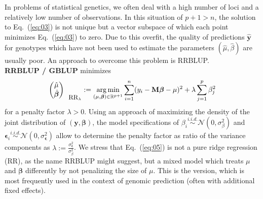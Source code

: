 \documentclass{bmcart}
\newcommand{\bb}{\bm{\beta}}
\DeclareMathOperator*{\argmin}{arg\,min}
\newcommand{\M}{\mathbf{M}}
\newcommand{\0}{\mathbf{0}}
\begin{document}
In problems of statistical genetics, we often deal with a high number of loci and a relatively low number of observations.
In this situation of $p + 1 > n$, the solution to Eq.~(\ref{eq:03}) is not unique but a vector subspace of which each point minimizes Eq.~(\ref{eq:03}) to zero.
Due to this overfit, the quality of predictions $\hat{\mathbf{y}}$ for genotypes which have not been used to estimate the parameters $(\hat{\mu},\hat{\beta})$ are usually poor. An approach to overcome this problem is RRBLUP.
\vspace{0.4cm}\\
{\bf RRBLUP / GBLUP} minimizes 
\begin{equation}\label{eq:05}
	\begin{pmatrix}
		\hat{\mu} \\
		\hat{\bm{\beta}}
	\end{pmatrix}_{\mbox{\small RR}_\lambda} :=\argmin_{(\mu,\bm{\beta}) \in \mathbb{R}^{p+1}} \sum\limits_{i=1}^n (y_i - \M\bm{\beta} - \mu)^2  + \lambda \sum\limits_{j=1}^p {\beta}_j^2
\end{equation}
for a penalty factor $\lambda > 0$. Using an approach of maximizing the density of the joint distribution of $(\mathbf{y},\bm{\beta})$, the model specifications of ${\beta_i}\stackrel{i.i.d.}{\sim} \mathcal{N}(0,\sigma_\beta^2)$ and ${\bm{\epsilon}_i}\stackrel{i.i.d.}{\sim} \mathcal{N}(0,\sigma_{\bm{\epsilon}}^2)$ allow to determine the penalty factor as ratio of the variance components  as $\lambda := \frac{\sigma_{\bm{\epsilon}}^2}{\sigma_\beta^2}$. We stress that Eq.~(\ref{eq:05}) is not a pure ridge regression (RR), as the name RRBLUP might suggest, but a mixed model which treats $\mu$ and $\bb$ differently by not penalizing the size of $\mu$. This is the version, which is most frequently used in the context of genomic prediction (often with additional fixed effects). \\
\end{document}

